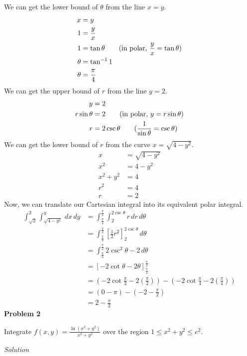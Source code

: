 \documentclass{article}
\newcommand{\lrp}[1]{\left( #1 \right)}
\newcommand{\lrb}[1]{\left[ #1 \right]}
\newcommand{\Solution}{\textit{Solution}}
\begin{document}
We can get the lower bound of $\theta$ from the line $x=y$.
\begin{align*}
    x&=y\\
    1&=\frac{y}{x}\\
    1&=\tan\theta\tag{in polar, $\displaystyle \frac{y}{x}=\tan\theta$}\\
    \theta &= \tan^{-1}1\\
    \theta &= \frac{\pi}{4}
\end{align*}
We can get the upper bound of $r$ from the line $y=2$.
\begin{align*}
    y&=2\\
    r\sin\theta&=2\tag{in polar, $y=r\sin\theta$}\\
    r&=2\csc\theta\tag{$\dfrac{1}{\sin\theta}=\csc\theta$}
\end{align*}
We can get the lower bound of $r$ from  the curve $x=\sqrt{4-y^2}$.
\begin{align*}
    x&=\sqrt{4-y^2}\\
    x^2&=4-y^2\\
    x^2+y^2&=4\\
    r^2&=4\tag{in polar, $x^2+y^2=r^2$}\\
    r&=2\tag{keep positive $r$}
\end{align*}
Now, we can translate our Cartesian integral into its equivalent polar integral.
\begin{align*}
    \int_{\sqrt{2}}^2\int_{\sqrt{4-y^2}}^y\,dx\,dy&=\int_{\frac{\pi}{4}}^{\frac{\pi}{2}}\int_2^{2\csc\theta}r\,dr\,d\theta\\
    &=\int_{\frac{\pi}{4}}^{\frac{\pi}{2}}\lrb{\frac{1}{2}r^2}_2^{2\csc\theta}\,d\theta\\
    &=\int_{\frac{\pi}{4}}^{\frac{\pi}{2}}2\csc^2\theta - 2\,d\theta\\
    &=\lrb{-2\cot\theta-2\theta}_{\frac{\pi}{4}}^{\frac{\pi}{2}}\\
    &=\lrp{-2\cot\frac{\pi}{2}-2\lrp{\frac{\pi}{2}}}-\lrp{-2\cot\frac{\pi}{4}-2\lrp{\frac{\pi}{4}}}\\
    &=\lrp{0-\pi}-\lrp{-2-\frac{\pi}{2}}\\
    &=\boxed{2-\frac{\pi}{2}}
\end{align*}
\textbf{Problem 2}

Integrate $\displaystyle f(x,y)=\frac{\ln(x^2+y^2)}{x^2+y^2}$ over the region $1\leq x^2+y^2\leq e^2$.

\Solution
\end{document}
